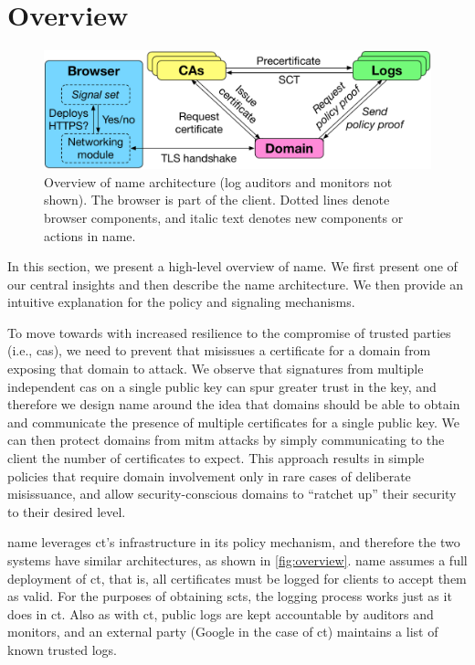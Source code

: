 \section{Overview}
\label{sec:overview}

\begin{figure}
  \centering \includegraphics[width=\linewidth]{fig/overview} \caption{Overview
    of \ac{name} architecture (log auditors and monitors not shown). The browser
    is part of the client. Dotted lines denote browser components, and italic
    text denotes new components or actions in \ac{name}.}
  \label{fig:overview}
\end{figure}

In this section, we present a high-level overview of \ac{name}. We first present
one of our central insights and then describe the \ac{name} architecture. We
then provide an intuitive explanation for the policy and signaling mechanisms.

To move towards  with increased resilience to the compromise of trusted
parties (i.e., \acp{ca}), we need to prevent  that misissues a
certificate for a domain from exposing that domain to  attack. We
observe that signatures from multiple independent \acp{ca} on a single public
key can spur greater trust in the key, and therefore we design \ac{name} around
the idea that domains should be able to obtain and communicate the presence of
multiple certificates for a single public key. We can then protect domains from
\ac{mitm} attacks by simply communicating to the client the number of
certificates to expect. This approach results in simple policies that require
domain involvement only in rare cases of deliberate misissuance, and allow
security-conscious domains to ``ratchet up'' their security to their desired
level.

\ac{name} leverages \ac{ct}'s infrastructure in its policy mechanism, and
therefore the two systems have similar architectures, as shown in
\autoref{fig:overview}.  \ac{name} assumes a full deployment of
\ac{ct}, that is, all certificates must be logged for clients to accept them as
valid. 
  For the purposes of obtaining \acp{sct}, the logging process works just as it
  does in \ac{ct}. Also as with \ac{ct}, public logs are kept accountable by
  auditors and monitors, and an external party (Google in the case of \ac{ct})
  maintains a list of known trusted logs.


